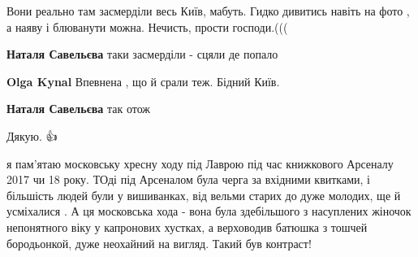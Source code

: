\begin{itemize}
Вони реально там засмерділи весь Київ, мабуть. Гидко дивитись навіть на фото ,
а наяву і блюванути можна.  Нечисть, прости господи.(((

\begin{itemize}
 
\textbf{Наталя Савельєва} таки засмерділи - сцяли де попало

 
\textbf{Olga Kynal} Впевнена , що й срали теж. Бідний Київ.

 
\textbf{Наталя Савельєва} так отож
\end{itemize}

 
Дякую. 👍

 

я пам'ятаю московську хресну ходу під Лаврою під час книжкового Арсеналу 2017
чи 18 року. ТОді під Арсеналом була черга за вхідними квитками, і більшість
людей були у вишиванках, від вельми старих до дуже молодих, ще й усміхалися . А
ця московська хода - вона була здебільшого з насуплених жіночок непонятного
віку у капронових хустках, а верховодив батюшка з тошчей бородьонкой, дуже
неохайний на вигляд. Такий був контраст!


 


\end{itemize}
